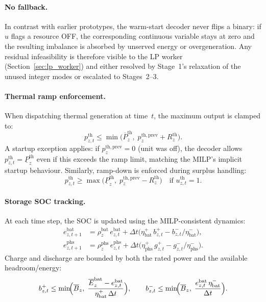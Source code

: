 \documentclass{article}
\begin{document}
\paragraph{No fallback.}
In contrast with earlier prototypes, the warm-start decoder never flips a binary: if $\hat{u}$ flags a resource OFF, the corresponding continuous variable stays at zero and the resulting imbalance is absorbed by unserved energy or overgeneration. Any residual infeasibility is therefore visible to the LP worker (Section~\ref{sec:lp_worker}) and either resolved by Stage~1's relaxation of the unused integer modes or escalated to Stages~2--3.

\paragraph{Thermal ramp enforcement.}
When dispatching thermal generation at time~$t$, the maximum output is clamped to:
\begin{equation}
p^{\mathrm{th}}_{z,t} \leq \min\!\bigl(\overline{P}^{\mathrm{th}}_z,\; p^{\mathrm{th,prev}}_z + R^{\mathrm{th}}_z\bigr).
\label{eq:decoder_ramp}
\end{equation}
A startup exception applies: if $p^{\mathrm{th,prev}}_z = 0$ (unit was off), the decoder allows $p^{\mathrm{th}}_{z,t} = \underline{P}^{\mathrm{th}}_z$ even if this exceeds the ramp limit, matching the MILP's implicit startup behaviour. Similarly, ramp-down is enforced during surplus handling:
\begin{equation}
p^{\mathrm{th}}_{z,t} \geq \max\!\bigl(\underline{P}^{\mathrm{th}}_z,\; p^{\mathrm{th,prev}}_z - R^{\mathrm{th}}_z\bigr) \quad \text{if } u^{\mathrm{th}}_{z,t} = 1.
\label{eq:decoder_ramp_down}
\end{equation}

\paragraph{Storage SOC tracking.}
At each time step, the SOC is updated using the MILP-consistent dynamics:
\begin{align}
e^{\mathrm{bat}}_{z,t+1} &= \rho^{\mathrm{bat}}_z \, e^{\mathrm{bat}}_{z,t} + \Delta t \bigl(\eta^+_{\mathrm{bat}} \, b^+_{z,t} - b^-_{z,t} / \eta^-_{\mathrm{bat}}\bigr), \label{eq:decoder_soc_bat} \\
e^{\mathrm{phs}}_{z,t+1} &= \rho^{\mathrm{phs}}_z \, e^{\mathrm{phs}}_{z,t} + \Delta t \bigl(\eta^+_{\mathrm{phs}} \, g^+_{z,t} - g^-_{z,t} / \eta^-_{\mathrm{phs}}\bigr). \label{eq:decoder_soc_phs}
\end{align}
Charge and discharge are bounded by both the rated power and the available headroom/energy:
\begin{equation}
b^+_{z,t} \leq \min\!\Bigl(\overline{B}_z, \; \frac{\overline{E}^{\mathrm{bat}}_z - e^{\mathrm{bat}}_{z,t}}{\eta^+_{\mathrm{bat}} \, \Delta t}\Bigr), \qquad
b^-_{z,t} \leq \min\!\Bigl(\overline{B}_z, \; \frac{e^{\mathrm{bat}}_{z,t} \, \eta^-_{\mathrm{bat}}}{\Delta t}\Bigr).
\label{eq:decoder_storage_bounds}
\end{equation}
\end{document}
